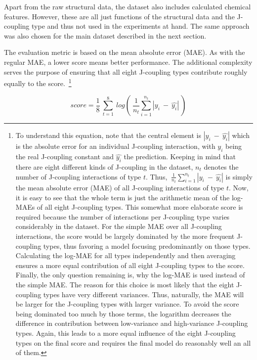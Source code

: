 Apart from the raw structural data, the dataset also includes calculated chemical features. However, these are all just functions of the structural data and the J-coupling type and thus not used in the experiments at hand. The same approach was also chosen for the main dataset described in the next section.

The evaluation metric is based on the mean absolute error (MAE). As with the regular MAE, a lower score means better performance. The additional complexity serves the purpose of ensuring that all eight J-coupling types contribute roughly equally to the score.~\footnote{
	To understand this equation, note that the central element is $|y_i~-~\hat{y_i}|$ which is the absolute error for an individual J-coupling interaction, with $y_i$ being the real J-coupling constant and $\hat{y_i}$ the prediction. Keeping in mind that there are eight different kinds of J-coupling in the dataset, $n_t$ denotes the number of J-coupling interactions of type $t$. Thus, $~\frac{1}{n_t} \sum_{i=1}^{n_t}|y_i~-~\hat{y_i}|$ is simply the mean absolute error (MAE) of all J-coupling interactions of type $t$. Now, it is easy to see that the whole term is just the arithmetic mean of the log-MAEs of all eight J-coupling types. This somewhat more elaborate score is required because the number of interactions per J-coupling type varies considerably in the dataset. For the simple MAE over all J-coupling interactions, the score would be largely dominated by the more frequent J-coupling types, thus favoring a model focusing predominantly on those types. Calculating the log-MAE for all types independently and then averaging ensures a more equal contribution of all eight J-coupling types to the score. Finally, the only question remaining is, why the log-MAE is used instead of the simple MAE. The reason for this choice is most likely that the eight J-coupling types have very different variances. Thus, naturally, the MAE will be larger for the J-coupling types with larger variance. To avoid the score being dominated too much by those terms, the logarithm decreases the difference in contribution between low-variance and high-variance J-coupling types. Again, this leads to a more equal influence of the eight J-coupling types on the final score and requires the final model do reasonably well an all of them.
}\label{fn:score}

\begin{equation}\label{eq:champs-score}
	score = \frac{1}{8} ~ \sum_{t=1}^{8} ~ log(~\frac{1}{n_t} \sum_{i=1}^{n_t}|y_i~-~\hat{y_i}| ~)
\end{equation}



